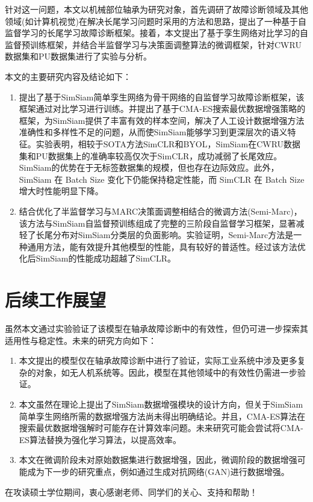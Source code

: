 \documentclass[master]{thesis-uestc}
\begin{document}
针对这一问题，本文以机械部位轴承为研究对象，首先调研了故障诊断领域及其他领域(如计算机视觉)在解决长尾学习问题时采用的方法和思路，提出了一种基于自监督学习的长尾学习故障诊断框架。接着，本文提出了基于孪生网络对比学习的自监督预训练框架，并结合半监督学习与决策面调整算法的微调框架，针对CWRU数据集和PU数据集进行了实验与分析。

本文的主要研究内容及结论如下：
\begin{enumerate}[label={(\arabic*)}]
    \item 提出了基于SimSiam简单孪生网络为骨干网络的自监督学习故障诊断框架，该框架通过对比学习进行训练。并提出了基于CMA-ES搜索最优数据增强策略的框架，为SimSiam提供了丰富有效的样本空间，解决了人工设计数据增强方法准确性和多样性不足的问题，从而使SimSiam能够学习到更深层次的语义特征。实验表明，相较于SOTA方法SimCLR和BYOL，SimSiam在CWRU数据集和PU数据集上的准确率较高仅次于SimCLR，成功减弱了长尾效应。SimSiam的优势在于无标签数据集的规模，但也存在边际效应。此外，SimSiam 在 Batch Size 变化下仍能保持稳定性能，而 SimCLR 在 Batch Size 增大时性能明显下降。
    \item 结合优化了半监督学习与MARC决策面调整相结合的微调方法(Semi-Marc)，该方法与SimSiam自监督预训练组成了完整的三阶段自监督学习框架，显著减轻了长尾分布对SimSiam分类层的负面影响。实验证明，Semi-Marc方法是一种通用方法，能有效提升其他模型的性能，具有较好的普适性。经过该方法优化后SimSiam的性能成功超越了SimCLR。
\end{enumerate}

\section{后续工作展望}
虽然本文通过实验验证了该模型在轴承故障诊断中的有效性，但仍可进一步探索其适用性与稳定性。未来的研究方向如下：

\begin{enumerate}[label={(\arabic*)}]
    \item 本文提出的模型仅在轴承故障诊断中进行了验证，实际工业系统中涉及更多复杂的对象，如无人机系统等。因此，模型在其他领域中的有效性仍需进一步验证。
    \item 本文虽然在理论上提出了SimSiam数据增强模块的设计方向，但关于SimSiam简单孪生网络所需的数据增强方法尚未得出明确结论。并且，CMA-ES算法在搜索最优数据增强解时可能存在计算效率问题。未来研究可能会尝试将CMA-ES算法替换为强化学习算法，以提高效率。
    \item 本文在微调阶段未对原始数据集进行数据增强，因此，微调阶段的数据增强可能成为下一步的研究重点，例如通过生成对抗网络(GAN)进行数据增强。
\end{enumerate}

\thesisacknowledgement
在攻读硕士学位期间，衷心感谢老师、同学们的关心、支持和帮助！

\thesisappendix



%
% 
%
% 
% 
%

\end{document}
